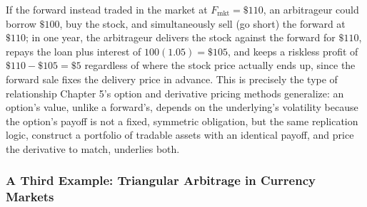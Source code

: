 \documentclass[../ai_in_finance]{subfiles}
\begin{document}
If the forward instead traded in the market at $F_{\text{mkt}} = \$110$, an arbitrageur could borrow $\$100$, buy the stock, and simultaneously sell (go short) the forward at $\$110$; in one year, the arbitrageur delivers the stock against the forward for $\$110$, repays the loan plus interest of $100(1.05) = \$105$, and keeps a riskless profit of $\$110 - \$105 = \$5$ regardless of where the stock price actually ends up, since the forward sale fixes the delivery price in advance. This is precisely the type of relationship Chapter 5's option and derivative pricing methods generalize: an option's value, unlike a forward's, depends on the underlying's volatility because the option's payoff is not a fixed, symmetric obligation, but the same replication logic, construct a portfolio of tradable assets with an identical payoff, and price the derivative to match, underlies both.

\subsubsection*{A Third Example: Triangular Arbitrage in Currency Markets}
\end{document}
